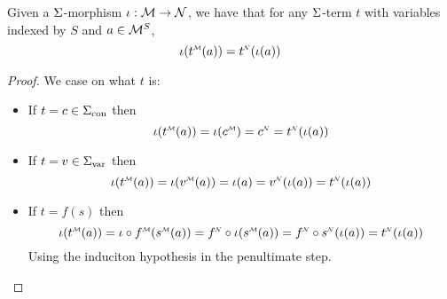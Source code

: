 \begin{prop}
    Given a $\Sigma$-morphism $\iota : \mathcal{M} \to \mathcal{N}$, 
    we have that for any $\Sigma$-term $t$ with variables indexed by $S$ and 
    $a \in \mathcal{M}^S$,
    \[\io(\mmintp{t}(a)) = \nnintp{t}(\io(a))\]
\end{prop}
\begin{proof}
    We case on what $t$ is:
    \begin{itemize}
        \item If $t = c \in {\Sigma}_\mathrm{con}$ then 
            \[
                \io(\mmintp{t}(a)) = \io(\mmintp{c}) = 
                \nnintp{c} = \nnintp{t}(\io(a))
            \]
        \item If $t = v \in {\Sigma}_\mathrm{var}$ then 
            \[
                \io(\mmintp{t}(a)) =
                \io(\mmintp{v}(a)) = \io(a) = 
                \nnintp{v}(\io(a)) = \nnintp{t}(\io(a))
            \]
        \item If $t = f(s)$ then
            \[
                \io(\mmintp{t}(a)) = \io \circ \mmintp{f}(\mmintp{s}(a)) = 
                \nnintp{f} \circ \io(\mmintp{s}(a)) = 
                \nnintp{f} \circ \nnintp{s}(\io(a)) =
                \nnintp{t}(\io(a))
            \]
            Using the induciton hypothesis in the penultimate step.
    \end{itemize}
\end{proof}

